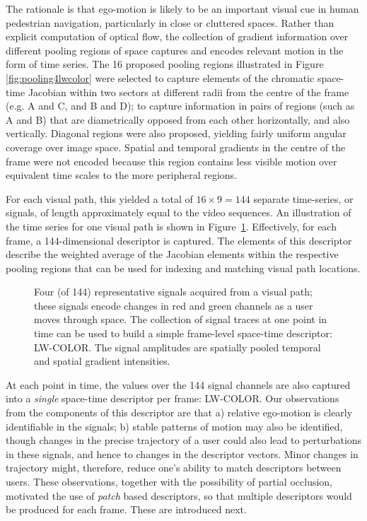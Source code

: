 The rationale is that ego-motion is likely to be an important visual cue in human pedestrian navigation, particularly in close or cluttered spaces. Rather than explicit computation of optical flow, the collection of gradient information over different pooling regions of space captures and encodes relevant motion in the form of time series.  The 16 proposed pooling regions illustrated in Figure \ref{fig:pooling4lwcolor} were selected to capture elements of the chromatic space-time Jacobian within two sectors at different radii from the centre of the frame (e.g. A and C, and B and D); to capture information in pairs of regions (such as A and B) that are diametrically opposed from each other horizontally, and also vertically.  Diagonal regions were also proposed, yielding fairly uniform angular coverage over image space. Spatial and temporal gradients in the centre of the frame were not encoded because this region contains less visible motion over equivalent time scales to the more peripheral regions.  


For each visual path, this yielded a total of $16\times 9 = 144$ separate time-series, or signals, of length approximately equal to the video sequences.  An illustration of the time series for one visual path is shown in Figure~\ref{fig:Traces}. Effectively, for each frame, a 144-dimensional descriptor is captured. The elements of this descriptor describe the weighted average of the Jacobian elements within the respective pooling regions that can be used for indexing and matching visual path locations.

\begin{figure}
\begin{center}
	\setlength{}
	\setlength{}
		
\caption{Four (of 144) representative signals acquired from a visual path; these signals encode changes in red and green channels as a user moves through space.  The collection of signal traces at one point in time can be used to build a simple frame-level space-time descriptor: LW-COLOR. The signal amplitudes are spatially pooled temporal and spatial gradient intensities.}
\label{fig:Traces}
\end{center}
\end{figure}

At each point in time, the values over the 144 signal channels are also captured into a \textit{single} space-time descriptor per frame: LW-COLOR.  Our observations from the components of this descriptor are that a) relative ego-motion is clearly identifiable in the signals; b) stable patterns of motion may also be identified, though changes in the precise trajectory of a user could also lead to perturbations in these signals, and hence to changes in the descriptor vectors. Minor changes in trajectory might, therefore, reduce one's ability to match descriptors between users.  These observations, together with the possibility of partial occlusion, motivated the use of \textit{patch} based descriptors, so that multiple descriptors would be produced for each frame. These are introduced next.


